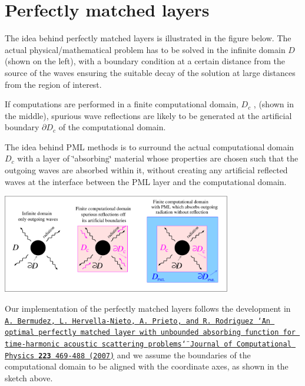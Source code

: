  

\hypertarget{index_pml}{}\section{Perfectly matched layers}\label{index_pml}
The idea behind perfectly matched layers is illustrated in the figure below. The actual physical/mathematical problem has to be solved in the infinite domain $ D $ (shown on the left), with a boundary condition at a certain distance from the source of the waves ensuring the suitable decay of the solution at large distances from the region of interest.

If computations are performed in a finite computational domain, $ D_c $ , (shown in the middle), spurious wave reflections are likely to be generated at the artificial boundary $ \partial D_c $ of the computational domain.

The idea behind P\+ML methods is to surround the actual computational domain $ D_c $ with a layer of \char`\"{}absorbing\char`\"{} material whose properties are chosen such that the outgoing waves are absorbed within it, without creating any artificial reflected waves at the interface between the P\+ML layer and the computational domain.

 
\begin{DoxyImage}
\includegraphics[width=0.75\textwidth]{pml}
\end{DoxyImage}


Our implementation of the perfectly matched layers follows the development in \href{http://www.sciencedirect.com/science/article/pii/S0021999106004487}{\tt A. Bermudez, L. Hervella-\/\+Nieto, A. Prieto, and R. Rodriguez \char`\"{}\+An optimal perfectly matched layer with unbounded 
absorbing function for time-\/harmonic acoustic scattering problems\char`\"{} Journal of Computational Physics {\bfseries 223} 469-\/488 (2007)} and we assume the boundaries of the computational domain to be aligned with the coordinate axes, as shown in the sketch above.

